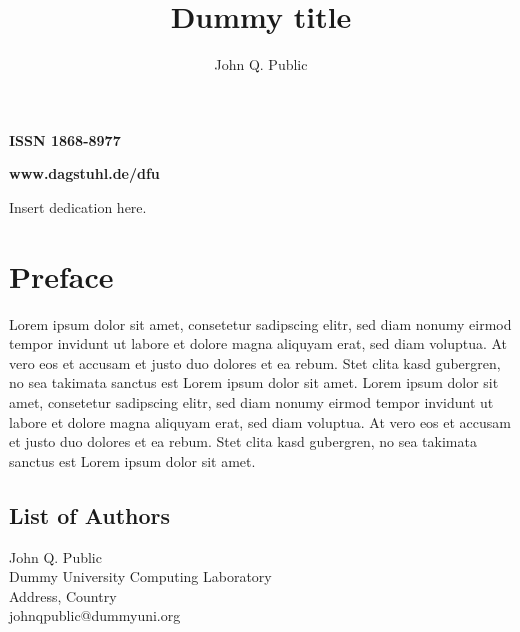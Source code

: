 \documentclass[a4paper,UKenglish]{dfumaster}
\begin{document}
\begin{publicationinfo}
 \bigskip
 \bigskip
 \bigskip


{\large\bf\sffamily ISSN 1868-8977}

 \bigskip
 \bigskip
 \bigskip

{\Large\bf\sffamily www.dagstuhl.de/dfu}
 
 \vfill
 
 \newpage
 
 \thispagestyle{empty}
 
\end{publicationinfo}


\begin{dedication}%
  Insert dedication here.
\end{dedication}


\begin{contentslist}

\contitem
\title{Dummy title}
\author{John Q. Public}

\end{contentslist}


\chapter{Preface}  %

Lorem ipsum dolor sit amet, consetetur sadipscing elitr, sed diam nonumy eirmod tempor invidunt ut labore et dolore magna aliquyam erat, sed diam voluptua. At vero eos et accusam et justo duo dolores et ea rebum. Stet clita kasd gubergren, no sea takimata sanctus est Lorem ipsum dolor sit amet. Lorem ipsum dolor sit amet, consetetur sadipscing elitr, sed diam nonumy eirmod tempor invidunt ut labore et dolore magna aliquyam erat, sed diam voluptua. At vero eos et accusam et justo duo dolores et ea rebum. Stet clita kasd gubergren, no sea takimata sanctus est Lorem ipsum dolor sit amet.

\begin{participants}
\chapter[Authors]{List of Authors}
\participant John Q. Public\\ 
  Dummy University Computing Laboratory\\
  Address, Country\\
  johnqpublic@dummyuni.org

\end{participants} 
\end{document}
